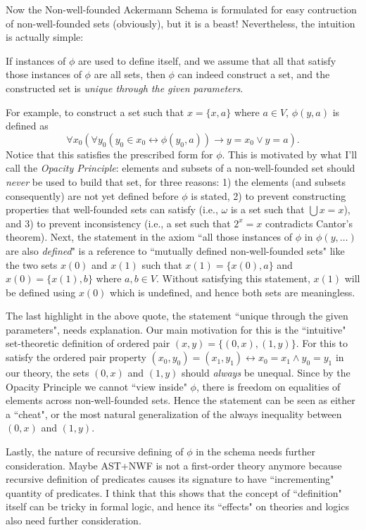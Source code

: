 \documentclass{article}
\begin{document}
Now the Non-well-founded Ackermann Schema is formulated for easy contruction of non-well-founded sets (obviously), but it is a beast! Nevertheless, the intuition is actually simple:

\begin{displayquote}
If instances of $\phi$ are used to define itself, and we assume that all that satisfy those instances of $\phi$ are all sets, then $\phi$ can indeed construct a set, and the constructed set is \textit{unique through the given parameters}.
\end{displayquote}

For example, to construct a set such that $x=\{x, a\}$ where $a \in V$, $\phi(y, a)$ is defined as $$\forall x_0 (\forall y_0 (y_0 \in x_0 \leftrightarrow \phi(y_0, a)) \rightarrow y = x_0 \vee y = a).$$ Notice that this satisfies the prescribed form for $\phi$. This is motivated by what I'll call the \textit{Opacity Principle}: elements and subsets of a non-well-founded set should \textit{never} be used to build that set, for three reasons: 1) the elements (and subsets consequently) are not yet defined before $\phi$ is stated, 2) to prevent constructing properties that well-founded sets can satisfy (i.e., $\omega$ is a set such that $\bigcup x = x$), and 3) to prevent inconsistency (i.e., a set such that $2^x = x$ contradicts Cantor's theorem). Next, the statement in the axiom ``all those instances of $\phi$ in $\phi(y, \ldots)$ are also \textit{defined}" is a reference to ``mutually defined non-well-founded sets" like the two sets $x(0)$ and $x(1)$ such that $x(1) = \{x(0), a\}$ and $x(0) = \{x(1), b\}$ where $a, b \in V$. Without satisfying this statement, $x(1)$ will be defined using $x(0)$ which is undefined, and hence both sets are meaningless.

The last highlight in the above quote, the statement ``unique through the given parameters", needs explanation. Our main motivation for this is the ``intuitive" set-theoretic definition of ordered pair $(x,y) = \{(0,x), (1, y)\}$. For this to satisfy the ordered pair property $(x_0,y_0) = (x_1, y_1) \leftrightarrow x_0 = x_1 \wedge y_0 = y_1$ in our theory, the sets $(0,x)$ and $(1,y)$ should \textit{always} be unequal. Since by the Opacity Principle we cannot ``view inside" $\phi$, there is freedom on equalities of elements across non-well-founded sets. Hence the statement can be seen as either a ``cheat", or the most natural generalization of the always inequality between $(0,x)$ and $(1,y)$.

Lastly, the nature of recursive defining of $\phi$ in the schema needs further consideration. Maybe \textsf{AST+NWF} is not a first-order theory anymore because recursive definition of predicates causes its signature to have ``incrementing" quantity of predicates. I think that this shows that the concept of ``definition" itself can be tricky in formal logic, and hence its ``effects" on theories and logics also need further consideration.



\end{document}
